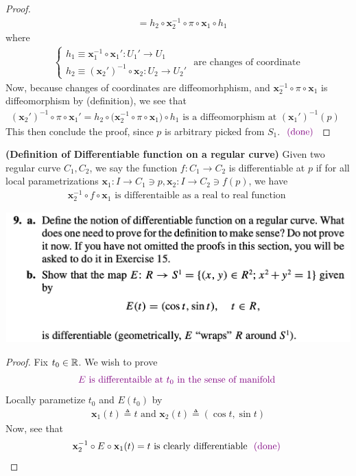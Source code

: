 \documentclass{report}
\begin{document}
\begin{proof}
\begin{align*}
  &=h_2\circ \textbf{x}_2^{-1} \circ  \pi \circ \textbf{x}_1 \circ h_1
\end{align*}
where
\begin{align*}
\begin{cases}
 h_1\equiv\textbf{x}_1^{-1}\circ \textbf{x}_1':U_1'\rightarrow U_1 \\
 h_2\equiv (\textbf{x}_2')^{-1}\circ \textbf{x}_2:U_2\rightarrow U_2'
\end{cases}\text{ are changes of coordinate }
\end{align*}
Now, because changes of coordinates are diffeomorhphism, and $\textbf{x}_2^{-1}\circ \pi \circ \textbf{x}_1$ is diffeomorphism by  (definition), we see that 
\begin{align*}
  (\textbf{x}_2')^{-1}\circ \pi \circ \textbf{x}_1'=h_2\circ \big(\textbf{x}_2^{-1}\circ \pi \circ \textbf{x}_1 \big)\circ h_1\text{ is a diffeomorphism at $(\textbf{x}_1')^{-1}(p)$ }
\end{align*}
This then conclude the proof, since $p$ is arbitrary picked from $S_1$. $\textcolor{violet}{\text{ (done) }}$
\end{proof}
\begin{definition}
\textbf{(Definition of Differentiable function on a regular curve)} Given two regular curve $C_1,C_2$, we say the function $f:C_1\rightarrow C_2$ is differentiable at $p$ if for all local parametrizations  $\textbf{x}_1:I\rightarrow C_1\ni p,\textbf{x}_2:I\rightarrow C_2\ni f(p)$,  we have 
\begin{align*}
\textbf{x}_2^{-1}\circ f\circ \textbf{x}_1\text{ is differentaible as a real to real function }
\end{align*}
\end{definition}
\begin{question}{}{}
\includegraphics[height=5cm,width=18cm]{HW3a3}
\end{question}
\begin{proof}
Fix $t_0 \in\mathbb{R}$. We wish to prove 
\begin{align*}
\textcolor{violet}{E\text{ is differentaible at $t_0$ in the sense of manifold }}
\end{align*}
Locally parametize $t_0$ and $E(t_0)$ by 
\begin{align*}
\textbf{x}_1(t)\triangleq t\text{ and }\textbf{x}_2(t)\triangleq (\cos t,\sin t)
\end{align*}
Now, see that 
\begin{align*}
\textbf{x}_2^{-1}\circ E\circ \textbf{x}_1(t)=t\text{ is clearly differentiable $\textcolor{violet}{\text{ (done) }}$}
\end{align*}
\end{proof}
\end{document}
